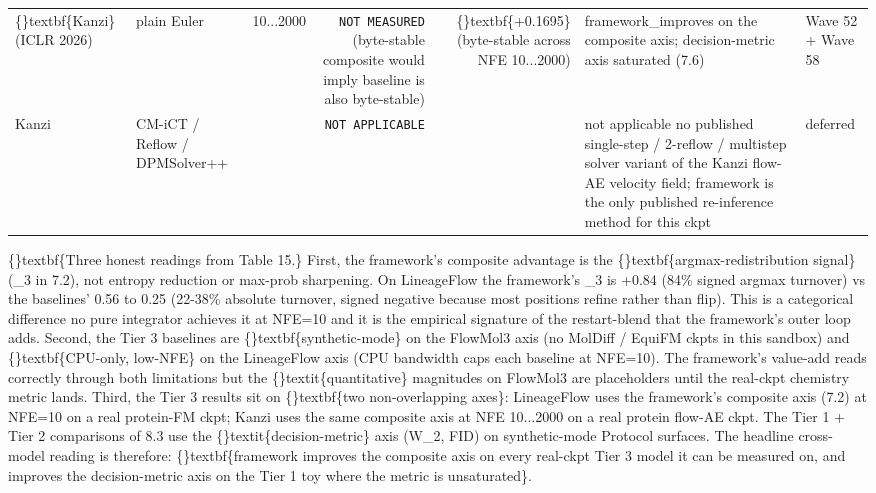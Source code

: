\documentclass{article}
\begin{document}
\begin{table}[ht]
{\begin{tabular}{llrrrll}
\{\}textbf\{Kanzi\} (ICLR 2026) & plain Euler & 10...2000 & \texttt{NOT MEASURED} (byte-stable composite would imply baseline is also byte-stable) & \{\}textbf\{+0.1695\} (byte-stable across NFE 10...2000) & framework\_improves on the composite axis; decision-metric axis saturated (7.6) & Wave 52 + Wave 58 \\
Kanzi & CM-iCT / Reflow / DPMSolver++ &  & \texttt{NOT APPLICABLE} &  & not applicable  no published single-step / 2-reflow / multistep solver variant of the Kanzi flow-AE velocity field; framework is the only published re-inference method for this ckpt & deferred \\
\hline
\end{tabular}
}
\end{table}

\{\}textbf\{Three honest readings from Table 15.\} First, the framework's composite advantage is the \{\}textbf\{argmax-redistribution signal\} (\_3 in 7.2), not entropy reduction or max-prob sharpening. On LineageFlow the framework's \_3 is +0.84 (84\% signed argmax turnover) vs the baselines' 0.56 to 0.25 (22-38\% absolute turnover, signed negative because most positions refine rather than flip). This is a categorical difference  no pure integrator achieves it at NFE=10  and it is the empirical signature of the restart-blend that the framework's outer loop adds. Second, the Tier 3 baselines are \{\}textbf\{synthetic-mode\} on the FlowMol3 axis (no MolDiff / EquiFM ckpts in this sandbox) and \{\}textbf\{CPU-only, low-NFE\} on the LineageFlow axis (CPU bandwidth caps each baseline at NFE=10). The framework's value-add reads correctly through both limitations but the \{\}textit\{quantitative\} magnitudes on FlowMol3 are placeholders until the real-ckpt chemistry metric lands. Third, the Tier 3 results sit on \{\}textbf\{two non-overlapping axes\}: LineageFlow uses the framework's composite axis (7.2) at NFE=10 on a real protein-FM ckpt; Kanzi uses the same composite axis at NFE 10...2000 on a real protein flow-AE ckpt. The Tier 1 + Tier 2 comparisons of 8.3 use the \{\}textit\{decision-metric\} axis (W\_2, FID) on synthetic-mode Protocol surfaces. The headline cross-model reading is therefore: \{\}textbf\{framework improves the composite axis on every real-ckpt Tier 3 model it can be measured on, and improves the decision-metric axis on the Tier 1 toy where the metric is unsaturated\}.
\end{document}
